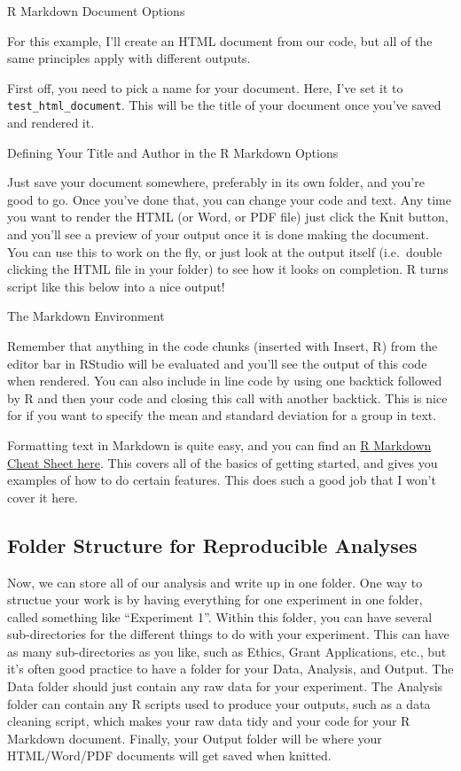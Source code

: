 \documentclass[
]{book}
\begin{document}
R Markdown Document Options

For this example, I'll create an HTML document from our code, but all of the same principles apply with different outputs.

First off, you need to pick a name for your document. Here, I've set it to \texttt{test\_html\_document}. This will be the title of your document once you've saved and rendered it.

Defining Your Title and Author in the R Markdown Options

Just save your document somewhere, preferably in its own folder, and you're good to go. Once you've done that, you can change your code and text. Any time you want to render the HTML (or Word, or PDF file) just click the Knit button, and you'll see a preview of your output once it is done making the document. You can use this to work on the fly, or just look at the output itself (i.e.~double clicking the HTML file in your folder) to see how it looks on completion. R turns script like this below into a nice output!

The Markdown Environment

Remember that anything in the code chunks (inserted with Insert, R) from the editor bar in RStudio will be evaluated and you'll see the output of this code when rendered. You can also include in line code by using one backtick followed by R and then your code and closing this call with another backtick. This is nice for if you want to specify the mean and standard deviation for a group in text.

Formatting text in Markdown is quite easy, and you can find an \href{https://www.rstudio.com/wp-content/uploads/2015/02/rmarkdown-cheatsheet.pdf}{R Markdown Cheat Sheet here}. This covers all of the basics of getting started, and gives you examples of how to do certain features. This does such a good job that I won't cover it here.

\hypertarget{folder-structure-for-reproducible-analyses}{%
\subsection{Folder Structure for Reproducible Analyses}\label{folder-structure-for-reproducible-analyses}}

Now, we can store all of our analysis and write up in one folder. One way to structue your work is by having everything for one experiment in one folder, called something like ``Experiment 1''. Within this folder, you can have several sub-directories for the different things to do with your experiment. This can have as many sub-directories as you like, such as Ethics, Grant Applications, etc., but it's often good practice to have a folder for your Data, Analysis, and Output. The Data folder should just contain any raw data for your experiment. The Analysis folder can contain any R scripts used to produce your outputs, such as a data cleaning script, which makes your raw data tidy and your code for your R Markdown document. Finally, your Output folder will be where your HTML/Word/PDF documents will get saved when knitted.
\end{document}
